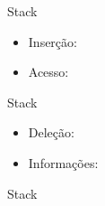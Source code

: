 \begin{frame}[fragile]{Stack}

    \begin{itemize}
        \item Inserção:
        \item Acesso:
    \end{itemize}

\end{frame}

\begin{frame}[fragile]{Stack}

    \begin{itemize}
        \item Deleção:
        \item Informações:
    \end{itemize}

\end{frame}

\begin{frame}[fragile]{Stack}


\end{frame}
